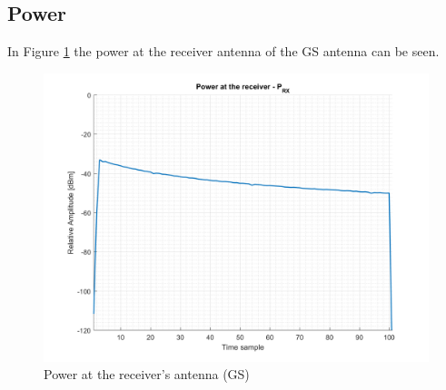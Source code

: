 \subsection{Power}
In Figure \ref{fig:s2_power} the power at the receiver antenna of the GS antenna can be seen.

\begin{figure}[H]
	\centering
	\includegraphics[scale=0.75]{figures/s2_power.png}
	\caption{Power at the receiver's antenna (GS)}
	\label{fig:s2_power}
\end{figure}

